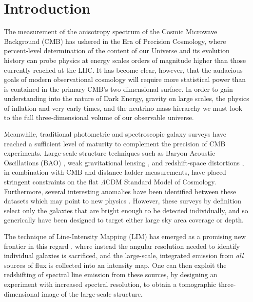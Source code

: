 \chapter{\label{chap:intro} Introduction}

The measurement of the anisotropy spectrum of the Cosmic Microwave Background (CMB) has ushered in the Era of Precision Cosmology, where percent-level determination of the content of our Universe and its evolution history can probe physics at energy scales orders of magnitude higher than those currently reached at the LHC. \cite{planckcosmo, planckxbicep} It has become clear, however, that the audacious goals of modern observational cosmology will require more statistical power than is contained in the primary CMB's two-dimensional surface. In order to gain understanding into the nature of Dark Energy, gravity on large scales, the physics of inflation and very early times, and the neutrino mass hierarchy we must look to the full three-dimensional volume of our observable universe. 

Meanwhile, traditional photometric and spectroscopic galaxy surveys have reached a sufficient level of maturity to complement the precision of CMB experiments. Large-scale structure techniques such as Baryon Acoustic Oscillations (BAO) \cite{boss}, weak gravitational lensing \cite{cfhtlens, kids450}, and redshift-space distortions \cite{rsd}, in combination with CMB and distance ladder measurements, have placed stringent constraints on the flat $\Lambda$CDM Standard Model of Cosmology. Furthermore, several interesting anomalies have been identified between these datasets which may point to new physics \cite{planckcosmo, h0}. However, these surveys by definition select only the galaxies that are bright enough to be detected individually, and so generically have been designed to target either large sky area coverage or depth.

The technique of Line-Intensity Mapping (LIM) has emerged as a promising new frontier in this regard \cite{statusreport}, where instead the angular resolution needed to identify individual galaxies is sacrificed, and the large-scale, integrated emission from \textit{all} sources of flux is collected into an intensity map. One can then exploit the redshifting of spectral line emission from these sources, by designing an experiment with increased spectral resolution, to obtain a tomographic three-dimensional image of the large-scale structure.

